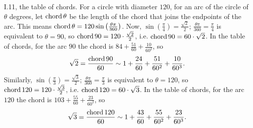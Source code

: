 \documentclass{article}
\newcommand{\chord}{\ensuremath\mathrm{chord}\,}
\theoremstyle{definition}
\begin{document}
I.11, the table of chords. For a circle with diameter $120$, for
an arc of the circle of $\theta$ degrees, let $\chord \theta$ be the length of the chord 
that joins the endpoints of the arc. This means
$\chord \theta = 120 \sin\left(\frac{\theta \pi}{360} \right)$. 
Now, $\sin\left( \frac{\pi}{4} \right) = \frac{\sqrt{2}}{2}$;
$\frac{\theta \pi}{360} = \frac{\pi}{4}$ is equivalent to
$\theta=90$, so
$\chord 90 = 120 \cdot \frac{\sqrt{2}}{2}$, i.e.
$\chord 90 = 60 \cdot \sqrt{2}$. In the table of chords, for
the arc $90$ the chord is $84+\frac{51}{60}+\frac{10}{60^2}$,
so
\[
\sqrt{2} = \frac{\chord 90}{60} \sim 1+\frac{24}{60}+\frac{51}{60^2}+\frac{10}{60^3}.
\]
Similarly, $\sin\left( \frac{\pi}{3} \right) = \frac{\sqrt{3}}{2}$;
$\frac{\theta \pi}{360} = \frac{\pi}{3}$ is equivalent to $\theta = 120$, so
$\chord 120 = 120 \cdot \frac{\sqrt{3}}{2}$, i.e. $\chord 120 = 60 \cdot \sqrt{3}$. 
In the table of chords, for the arc $120$ the chord is $103+\frac{55}{60}+\frac{23}{60^2}$, so
\[
\sqrt{3} = \frac{\chord 120}{60} \sim 1+\frac{43}{60}+\frac{55}{60^2}+\frac{23}{60^3}.
\]
\end{document}
